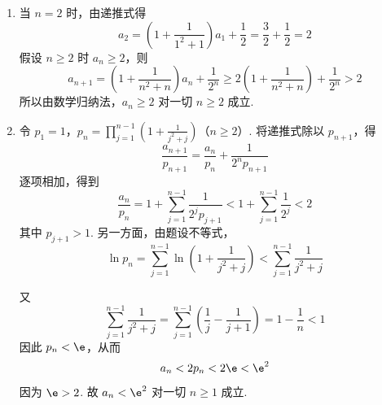 \begin{solution}
\begin{enumerate}
\item 当 \(n=2\) 时，由递推式得
\[
a_{2}=\left(1+\frac{1}{1^{2}+1}\right)a_{1}+\frac12=\frac32+\frac12=2
\]
假设 \(n\geqslant2\) 时 \(a_{n}\geqslant2\)，则
\[
a_{n+1}=\left(1+\frac{1}{n^{2}+n}\right)a_{n}+\frac{1}{2^{n}}
\geqslant2\left(1+\frac{1}{n^{2}+n}\right)+\frac{1}{2^{n}}>2
\]
所以由数学归纳法，\(a_{n}\geqslant2\) 对一切 \(n\geqslant2\) 成立.

\item 令 \(p_{1}=1\)，\(p_{n}=\prod_{j=1}^{n-1}\left(1+\frac{1}{j^{2}+j}\right)\)（\(n\geqslant2\)）.
将递推式除以 \(p_{n+1}\)，得
\[
\frac{a_{n+1}}{p_{n+1}}=\frac{a_{n}}{p_{n}}+\frac{1}{2^{n}p_{n+1}}
\]
逐项相加，得到
\[
\frac{a_{n}}{p_{n}}=1+\sum_{j=1}^{n-1}\frac{1}{2^{j}p_{j+1}}<1+\sum_{j=1}^{n-1}\frac{1}{2^{j}}<2
\]
其中 \(p_{j+1}>1\). 另一方面，由题设不等式，
\[
\ln p_{n}
=\sum_{j=1}^{n-1}\ln\left(1+\frac{1}{j^{2}+j}\right)
<\sum_{j=1}^{n-1}\frac{1}{j^{2}+j}
\]

又
\[
\sum_{j=1}^{n-1}\frac{1}{j^{2}+j}
=\sum_{j=1}^{n-1}\left(\frac1j-\frac{1}{j+1}\right)=1-\frac1n<1
\]
因此 \(p_{n}<\e\)，从而
\[
a_{n}<2p_{n}<2\e<\e^{2}
\]
因为 \(\e>2\). 故 \(a_{n}<\e^{2}\) 对一切 \(n\geqslant1\) 成立.
\end{enumerate}
\end{solution}
